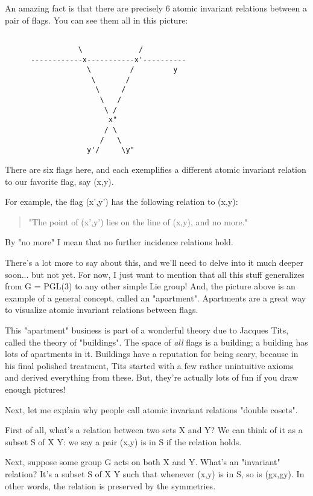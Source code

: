 An amazing fact is that there are precisely 6 atomic invariant relations 
between a pair of flags.  You can see them all in this picture:


\begin{verbatim}

                 \             /
      ------------x-----------x'----------
                   \         /         y
                    \       /
                     \     /
                      \   /
                       \ /
                        x"
                       / \
                      /   \
                   y'/     \y"
\end{verbatim}
    
There are six flags here, and each exemplifies a different
atomic invariant relation to our favorite flag, say (x,y).

For example, the flag (x',y') has the following relation to (x,y):

\begin{quote}
   "The point of (x',y') lies on the line of (x,y), and no more."
\end{quote}
By "no more" I mean that no further incidence relations hold.

There's a lot more to say about this, and we'll need to delve into
it much deeper soon... but not yet.  For now, I just want to mention 
that all this stuff generalizes from G = PGL(3) to any other simple 
Lie group!  And, the picture above is an example of a general concept, 
called an "apartment".  Apartments are a great way to visualize 
atomic invariant relations between flags.

This "apartment" business is part of a wonderful theory due
to Jacques Tits, called the theory of "buildings".  The
space of \emph{all} flags is a building; a building has lots of apartments
in it.  Buildings have a reputation for being scary, because in his
final polished treatment, Tits started with a few rather unintuitive
axioms and derived everything from these.  But, they're actually lots
of fun if you draw enough pictures!

Next, let me explain why people call atomic invariant relations
"double cosets".

First of all, what's a relation between two sets X and Y?  We can
think of it as a subset S of X \times  Y: we say a pair (x,y) is in S
if the relation holds.

Next, suppose some group G acts on both X and Y.  What's an
"invariant" relation?  It's a subset S of X \times  Y such
that whenever (x,y) is in S, so is (gx,gy).  In other words, the
relation is preserved by the symmetries.

